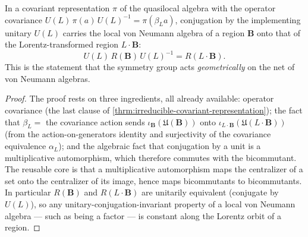 \begin{theorem}
    \label{thrm:von-neumann-geometric-covariance}
    \leanok
    In a covariant representation $\pi$ of the quasilocal algebra with the operator covariance $U(L)\,\pi(a)\,U(L)^{-1} = \pi(\beta_L a)$, conjugation by the implementing unitary $U(L)$ carries the local von Neumann algebra of a region $\mathbf{B}$ onto that of the Lorentz-transformed region $L \cdot \mathbf{B}$:
    \[ U(L)\, R(\mathbf{B})\, U(L)^{-1} = R(L \cdot \mathbf{B}). \]
    This is the statement that the symmetry group acts \emph{geometrically} on the net of von Neumann algebras.
\end{theorem}
\begin{proof}
    \leanok
    The proof rests on three ingredients, all already available: operator covariance (the last clause of \ref{thrm:irreducible-covariant-representation}); the fact that $\beta_L = $ the covariance action sends $\iota_{\mathbf{B}}(\mathfrak{U}(\mathbf{B}))$ onto $\iota_{L\cdot\mathbf{B}}(\mathfrak{U}(L\cdot\mathbf{B}))$ (from the action-on-generators identity and surjectivity of the covariance equivalence $\alpha_L$); and the algebraic fact that conjugation by a unit is a multiplicative automorphism, which therefore commutes with the bicommutant. The reusable core is that a multiplicative automorphism maps the centralizer of a set onto the centralizer of its image, hence maps bicommutants to bicommutants. In particular $R(\mathbf{B})$ and $R(L \cdot \mathbf{B})$ are unitarily equivalent (conjugate by $U(L)$), so any unitary-conjugation-invariant property of a local von Neumann algebra --- such as being a factor --- is constant along the Lorentz orbit of a region.
\end{proof}

